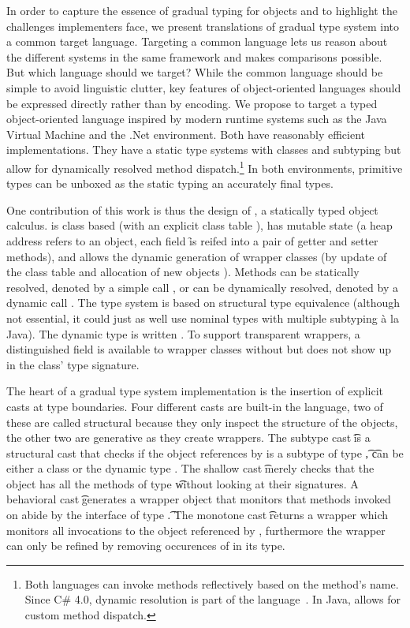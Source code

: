 \documentclass[a4paper,USenglish]{tex/lipics-v2016}
\begin{document}
In order to capture the essence of gradual typing for objects and to
highlight the challenges implementers face, we present translations of
gradual type system into a common target language. Targeting a common
language lets us reason about the different systems in the same framework
and makes comparisons possible. But which language should we target?  While
the common language should be simple to avoid linguistic clutter, key
features of object-oriented languages should be expressed directly rather
than by encoding. We propose to target a typed object-oriented language
inspired by modern runtime systems such as the Java Virtual Machine and the
.Net environment.  Both have reasonably efficient implementations. They have
a static type systems with classes and subtyping but allow for dynamically
resolved method dispatch.\footnote{Both languages can invoke methods
  reflectively based on the method's name. Since C\# 4.0, dynamic resolution
  is part of the language~\cite{BAT14}. In Java,  allows
  for custom method dispatch.} In both environments, primitive types can be
unboxed as the static typing an accurately final types.

One contribution of this work is thus the design of \kafka, a statically
typed object calculus.  \kafka is class based (with an explicit class table
\K), has mutable state (a heap address \a refers to an object, each field \f
is reifed into a pair of getter and setter methods), and allows the dynamic
generation of wrapper classes (by update of the class table \K and
allocation of new objects \a).  Methods can be statically resolved, denoted
by a simple call \Call\a\m\x, or can be dynamically resolved, denoted by a
dynamic call \DynCall\a\m\x. The \kafka type system is based on structural
type equivalence (although not essential, it could just as well use nominal
types with multiple subtyping \`a la Java).  The dynamic type is written
\any. To support transparent wrappers, a distinguished \that field is
available to wrapper classes without but does not show up in the class' type
signature.


The heart of a gradual type system implementation is the insertion of
explicit casts at type boundaries.  Four different casts are built-in the
language, two of these are called structural because they only inspect the
structure of the objects, the other two are generative as they create
wrappers.  The subtype cast \SubCast\t\a is a structural cast that checks if
the object references by \a is a subtype of type \t, \t can be either a
class \C or the dynamic type \any.  The shallow cast \ShaCast\t\a merely
checks that the object has all the methods of type \t without looking at
their signatures. A behavioral cast \BehCast\t\a generates a wrapper object
that monitors that methods invoked on \a abide by the interface of type
\t. The monotone cast \MonCast\t\a returns a wrapper which monitors all
invocations to the object referenced by \a, furthermore the wrapper can only
be refined by removing occurences of \any in its type.
\end{document}
